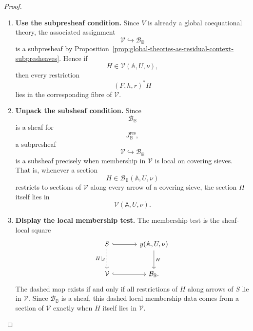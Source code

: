\begin{proof}
    \leavevmode
    \begin{enumerate}
        \item \textbf{Use the subpresheaf condition.}
        Since \(V\) is already a global coequational theory, the associated
        assignment
        \[
            \mathcal V\hookrightarrow\mathcal B_{\mathbb B}
        \]
        is a subpresheaf by
        Proposition~\ref{prop:global-theories-as-residual-context-subpresheaves}.
        Hence if
        \[
            H\in\mathcal V(\mathbb A,U,\nu),
        \]
        then every restriction
        \[
            (F,h,r)^*H
        \]
        lies in the corresponding fibre of \(\mathcal V\).

        \item \textbf{Unpack the subsheaf condition.}
        Since
        \[
            \mathcal B_{\mathbb B}
        \]
        is a sheaf for
        \[
            J_{\mathbb B}^{\mathrm{res}},
        \]
        a subpresheaf
        \[
            \mathcal V\hookrightarrow\mathcal B_{\mathbb B}
        \]
        is a subsheaf precisely when membership in \(\mathcal V\) is local on
        covering sieves. That is, whenever a section
        \[
            H\in\mathcal B_{\mathbb B}(\mathbb A,U,\nu)
        \]
        restricts to sections of \(\mathcal V\) along every arrow of a
        covering sieve, the section \(H\) itself lies in
        \[
            \mathcal V(\mathbb A,U,\nu).
        \]

        \item \textbf{Display the local membership test.}
        The membership test is the sheaf-local square
        \[
        \begin{tikzcd}[column sep=large, row sep=large]
            S
                \arrow[r, hook]
                \arrow[d, dashed, "{H|_S}"']
            &
            y(\mathbb A,U,\nu)
                \arrow[d, "H"]
            \\
            \mathcal V
                \arrow[r, hook]
            &
            \mathcal B_{\mathbb B}.
        \end{tikzcd}
        \]
        The dashed map exists if and only if all restrictions of \(H\) along
        arrows of \(S\) lie in \(\mathcal V\). Since
        \(\mathcal B_{\mathbb B}\) is a sheaf, this dashed local membership
        data comes from a section of \(\mathcal V\) exactly when \(H\) itself
        lies in \(\mathcal V\).
    \end{enumerate}
\end{proof}

